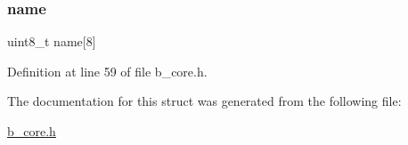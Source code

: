 \subsubsection{\texorpdfstring{name}{name}}
{\footnotesize\ttfamily uint8\+\_\+t name\mbox{[}8\mbox{]}}



Definition at line 59 of file b\+\_\+core.\+h.



The documentation for this struct was generated from the following file\+:\begin{DoxyCompactItemize}
\item 
\mbox{\hyperlink{b__core_8h}{b\+\_\+core.\+h}}\end{DoxyCompactItemize}
